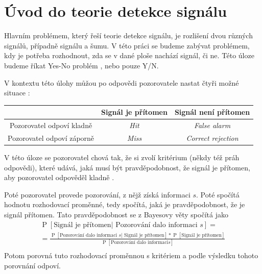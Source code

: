 \section{Úvod do teorie detekce signálu}

Hlavním problémem, který řeší teorie detekce signálu, je rozlišení dvou různých signálů, případně signálu a
šumu. V této práci se budeme zabývat problémem, kdy je potřeba rozhodnout, zda
se v dané ploše nachází signál, či ne. Této úloze budeme říkat Yes-No problém \citep{NeilSDT},
nebo pouze Y/N.

V kontextu této úlohy můžou po odpovědi pozorovatele nastat čtyři možné situace \citep{Pepa}:

\bigskip\noindent
\begin{center}
\begin{tabular}{ccc}
\hline
\hline
& Signál je přítomen & Signál není přítomen \\
\hline
Pozorovatel odpoví kladně &{\it Hit}&{\it False alarm} \\
Pozorovatel odpoví záporně &{\it Miss}&{\it Correct rejection}\\
\hline
\hline
\end{tabular}
\end{center}
\bigskip
{}

 V této úloze se pozorovatel chová tak,
že si zvolí kritérium (někdy též práh odpovědi), které udává, jaká musí být
pravděpodobnost, že signál je přítomen, aby pozorovatel odpověděl kladně \citep[kapitola 1.7]{GreenSDT}.

\def\P#1{\operatorname{P}\left[#1\right]}
\def\E#1{\mathbb{E}\left[#1\right]}
\def\tP#1{\P{\text{#1}}}

Poté pozorovatel provede pozorování, z nějž získá informaci $s$. Poté spočítá
hodnotu rozhodovací proměnné, tedy spočítá, jaká je pravděpodobnost, že je
signál přítomen. Tato pravděpodobnost se z Bayesovy věty spočítá jako 
\begin{multline*}
\tP{Signál je přítomen| Pozorování dalo informaci $s$} = \\ 
=\frac{\tP{Pozorování dalo informaci $s$
| Signál je přítomen}*\tP{Signál je přítomen}}{\tP{Pozorování dalo informaci
$s$}}\\ \end{multline*}
Potom porovná tuto rozhodovací proměnnou s kritériem a podle výsledku tohoto
porovnání odpoví.


